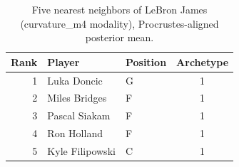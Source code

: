 \begin{table}[htbp]
  \centering\small
  \begin{tabular}{rllc}
    \toprule
    Rank & Player & Position & Archetype \\
    \midrule
    1 & Luka Doncic & G & 1 \\
    2 & Miles Bridges & F & 1 \\
    3 & Pascal Siakam & F & 1 \\
    4 & Ron Holland & F & 1 \\
    5 & Kyle Filipowski & C & 1 \\
    \bottomrule
  \end{tabular}
  \caption{Five nearest neighbors of LeBron James (curvature_m4 modality), Procrustes-aligned posterior mean.}
  \label{tab:LeBron_James_neighbors_curvature_m4}
\end{table}

